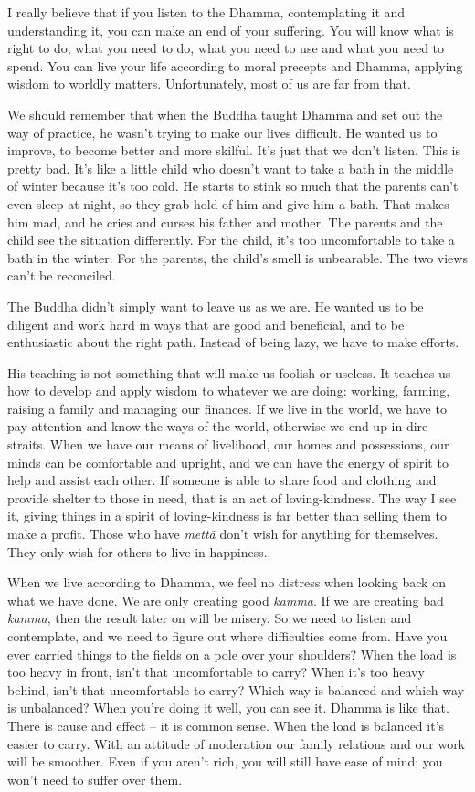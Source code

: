 I really believe that if you listen to the Dhamma, contemplating it and
understanding it, you can make an end of your suffering. You will know
what is right to do, what you need to do, what you need to use and what
you need to spend. You can live your life according to moral precepts
and Dhamma, applying wisdom to worldly matters. Unfortunately, most of
us are far from that. 

We should remember that when the Buddha taught Dhamma and set out the
way of practice, he wasn't trying to make our lives difficult. He wanted
us to improve, to become better and more skilful. It's just that we
don't listen. This is pretty bad. It's like a little child who doesn't
want to take a bath in the middle of winter because it's too cold. He
starts to stink so much that the parents can't even sleep at night, so
they grab hold of him and give him a bath. That makes him mad, and he
cries and curses his father and mother. The parents and the child see
the situation differently. For the child, it's too uncomfortable to take
a bath in the winter. For the parents, the child's smell is unbearable. 
The two views can't be reconciled. 

The Buddha didn't simply want to leave us as we are. He wanted us to be
diligent and work hard in ways that are good and beneficial, and to be
enthusiastic about the right path. Instead of being lazy, we have to
make efforts. 

His teaching is not something that will make us foolish or useless. It
teaches us how to develop and apply wisdom to whatever we are doing: 
working, farming, raising a family and managing our finances. If we live
in the world, we have to pay attention and know the ways of the world, 
otherwise we end up in dire straits. When we have our means of
livelihood, our homes and possessions, our minds can be comfortable and
upright, and we can have the energy of spirit to help and assist each
other. If someone is able to share food and clothing and provide shelter
to those in need, that is an act of loving-kindness. The way I see it, 
giving things in a spirit of loving-kindness is far better than selling
them to make a profit. Those who have \emph{mettā} don't wish for
anything for themselves. They only wish for others to live in happiness. 

When we live according to Dhamma, we feel no distress when looking back
on what we have done. We are only creating good \emph{kamma}. If we are
creating bad \emph{kamma}, then the result later on will be misery. So
we need to listen and contemplate, and we need to figure out where
difficulties come from. Have you ever carried things to the fields on a
pole over your shoulders? When the load is too heavy in front, isn't
that uncomfortable to carry? When it's too heavy behind, isn't that
uncomfortable to carry? Which way is balanced and which way is
unbalanced? When you're doing it well, you can see it. Dhamma is like
that. There is cause and effect -- it is common sense. When the load is
balanced it's easier to carry. With an attitude of moderation our family
relations and our work will be smoother. Even if you aren't rich, you
will still have ease of mind; you won't need to suffer over them. 

